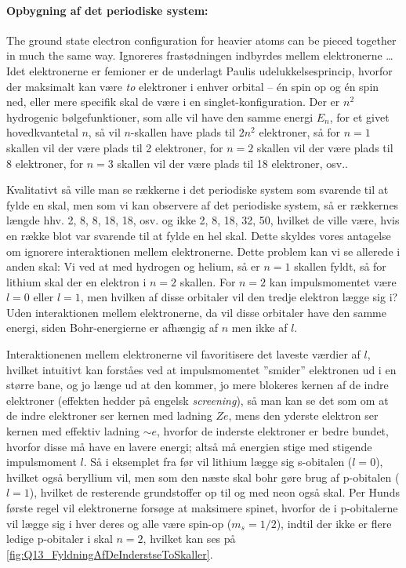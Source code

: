 \paragraph{Opbygning af det periodiske system:} The ground state electron configuration for heavier atoms can be pieced together in much the same way. Ignoreres frastødningen indbyrdes mellem elektronerne \ldots
\noindent
Idet elektronerne er femioner er de underlagt Paulis udelukkelsesprincip, hvorfor der maksimalt kan være \emph{to} elektroner i enhver orbital -- én spin op og én spin ned, eller mere specifik skal de være i en singlet-konfiguration. Der er $n^2$ hydrogenic bølgefunktioner, som alle vil have den samme energi $E_n$, for et givet hovedkvantetal $n$, så vil $n$-skallen have plads til $2n^2$ elektroner, så for $n=1$ skallen vil der være plads til 2 elektroner, for $n=2$ skallen vil der være plads til 8 elektroner, for $n=3$ skallen vil der være plads til 18 elektroner, osv..

Kvalitativt så ville man se rækkerne i det periodiske system som svarende til at fylde en skal, men som vi kan observere af det periodiske system, så er rækkernes længde hhv. 2, 8, 8, 18, 18, osv. og ikke 2, 8, 18, 32, 50, hvilket de ville være, hvis en række blot var svarende til at fylde en hel skal. Dette skyldes vores antagelse om ignorere interaktionen mellem elektronerne. Dette problem kan vi se allerede i anden skal: Vi ved at med hydrogen og helium, så er $n=1$ skallen fyldt, så for lithium skal der en elektron i $n=2$ skallen. For $n=2$ kan impulsmomentet være $l=0$ eller $l=1$, men hvilken af disse orbitaler vil den tredje elektron lægge sig i? Uden interaktionen mellem elektronerne, da vil disse orbitaler have den samme energi, siden Bohr-energierne er afhængig af $n$ men ikke af $l$.

Interaktionenen mellem elektronerne vil favoritisere det laveste værdier af $l$, hvilket intuitivt kan forståes ved at impulsmomentet ''smider'' elektronen ud i en større bane, og jo længe ud at den kommer, jo mere blokeres kernen af de indre elektroner (effekten hedder på engelsk \emph{screening}), så man kan se det som om at de indre elektroner ser kernen med ladning $Ze$, mens den yderste elektron ser kernen med effektiv ladning $\sim e$, hvorfor de inderste elektroner er bedre bundet, hvorfor disse må have en lavere energi; altså må energien stige med stigende impulsmoment $l$. Så i eksemplet fra før vil lithium lægge sig s-obitalen ($l=0$), hvilket også beryllium vil, men som den næste skal bohr gøre brug af p-obitalen ($l=1$), hvilket de resterende grundstoffer op til og med neon også skal. Per Hunds første regel vil elektronerne forsøge at maksimere spinet, hvorfor de i p-obitalerne vil lægge sig i hver deres og alle være spin-op ($m_s = 1/2$), indtil der ikke er flere ledige p-obitaler i skal $n=2$, hvilket kan ses på \cref{fig:Q13_FyldningAfDeInderstseToSkaller}.

